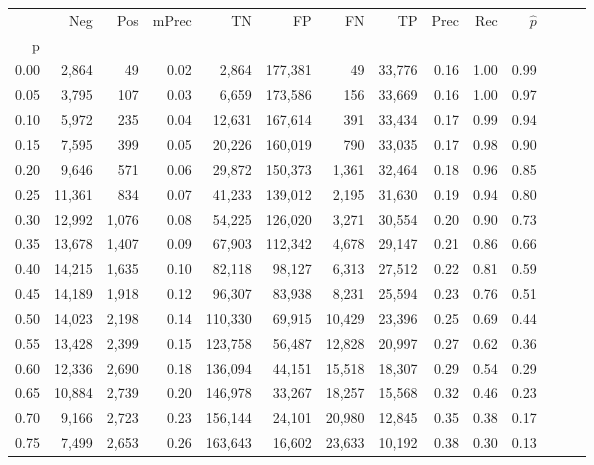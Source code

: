 \begin{tabular}{rrrrrrrrrrrrrr}
\toprule
{} &     Neg &    Pos & mPrec &       TN &       FP &      FN &      TP &  Prec &   Rec & $\hat{p}$ \\
p    &         &        &       &          &          &         &         &       &       &           \\
\midrule
0.00 &   2,864 &     49 &  0.02 &    2,864 &  177,381 &      49 &  33,776 &  0.16 &  1.00 &      0.99 \\
0.05 &   3,795 &    107 &  0.03 &    6,659 &  173,586 &     156 &  33,669 &  0.16 &  1.00 &      0.97 \\
0.10 &   5,972 &    235 &  0.04 &   12,631 &  167,614 &     391 &  33,434 &  0.17 &  0.99 &      0.94 \\
0.15 &   7,595 &    399 &  0.05 &   20,226 &  160,019 &     790 &  33,035 &  0.17 &  0.98 &      0.90 \\
0.20 &   9,646 &    571 &  0.06 &   29,872 &  150,373 &   1,361 &  32,464 &  0.18 &  0.96 &      0.85 \\
0.25 &  11,361 &    834 &  0.07 &   41,233 &  139,012 &   2,195 &  31,630 &  0.19 &  0.94 &      0.80 \\
0.30 &  12,992 &  1,076 &  0.08 &   54,225 &  126,020 &   3,271 &  30,554 &  0.20 &  0.90 &      0.73 \\
0.35 &  13,678 &  1,407 &  0.09 &   67,903 &  112,342 &   4,678 &  29,147 &  0.21 &  0.86 &      0.66 \\
0.40 &  14,215 &  1,635 &  0.10 &   82,118 &   98,127 &   6,313 &  27,512 &  0.22 &  0.81 &      0.59 \\
0.45 &  14,189 &  1,918 &  0.12 &   96,307 &   83,938 &   8,231 &  25,594 &  0.23 &  0.76 &      0.51 \\
0.50 &  14,023 &  2,198 &  0.14 &  110,330 &   69,915 &  10,429 &  23,396 &  0.25 &  0.69 &      0.44 \\
0.55 &  13,428 &  2,399 &  0.15 &  123,758 &   56,487 &  12,828 &  20,997 &  0.27 &  0.62 &      0.36 \\
0.60 &  12,336 &  2,690 &  0.18 &  136,094 &   44,151 &  15,518 &  18,307 &  0.29 &  0.54 &      0.29 \\
0.65 &  10,884 &  2,739 &  0.20 &  146,978 &   33,267 &  18,257 &  15,568 &  0.32 &  0.46 &      0.23 \\
0.70 &   9,166 &  2,723 &  0.23 &  156,144 &   24,101 &  20,980 &  12,845 &  0.35 &  0.38 &      0.17 \\
0.75 &   7,499 &  2,653 &  0.26 &  163,643 &   16,602 &  23,633 &  10,192 &  0.38 &  0.30 &      0.13 \\

\end{tabular}
